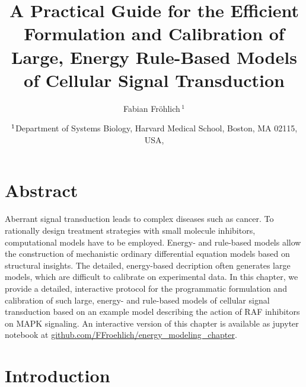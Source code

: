 \documentclass[11pt]{article}
\title{A Practical Guide for the Efficient Formulation and Calibration
of Large, Energy Rule-Based Models of Cellular Signal
Transduction}
\author{
Fabian Fr\"ohlich\,$^{\text{1}}$
}
\date{%
$^{\text{\sf 1}}$Department of Systems Biology, Harvard Medical School, Boston, MA 02115, USA,\\
}
\begin{document}
    
    \maketitle
    
    

    \hypertarget{abstract}{%
\section*{Abstract}\label{abstract}}

    Aberrant signal transduction leads to complex diseases such as cancer.
To rationally design treatment strategies with small molecule
inhibitors, computational models have to be employed. Energy- and
rule-based models allow the construction of mechanistic ordinary
differential equation models based on structural insights. The detailed,
energy-based decription often generates large models, which are
difficult to calibrate on experimental data. In this chapter, we provide
a detailed, interactive protocol for the programmatic formulation and
calibration of such large, energy- and rule-based models of cellular
signal transduction based on an example model describing the action of
RAF inhibitors on MAPK signaling. An interactive version of this chapter
is available as jupyter notebook at
\href{https:://github.com/FFroehlich/energy_modeling_chapter}{github.com/FFroehlich/energy\_modeling\_chapter}.

    \hypertarget{introduction}{%
\section{Introduction}\label{introduction}}
\end{document}
